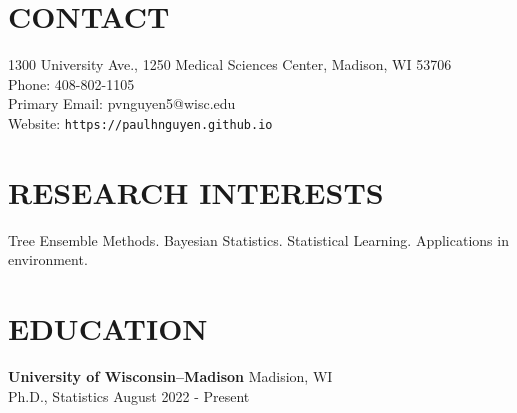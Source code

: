 \documentclass[margin]{res}
\begin{document}
  
                        
\begin{resume}                        
  
  \section{CONTACT} 
  1300 University Ave., 1250 Medical Sciences Center, Madison, WI 53706 \\
  Phone: 408-802-1105 \\ 
  Primary Email: pvnguyen5@wisc.edu \\
  Website: \texttt{https://paulhnguyen.github.io}

  \section{RESEARCH INTERESTS}
  Tree Ensemble Methods. Bayesian Statistics. Statistical Learning. Applications in environment.
              


              
\section{EDUCATION}      
                {\bf University of Wisconsin--Madison} \hfill Madision, WI \\
                Ph.D., Statistics \hfill August 2022 - Present \\
                

\end{resume}
\end{document}
